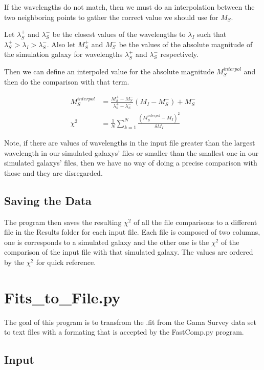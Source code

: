 \documentclass[11pt]{report}
\begin{document}
If the wavelengths do not match, then we must do an interpolation between the two neighboring points to gather the correct value we should use for $M_S$. 

Let $\lambda_S^+$ and $\lambda_S^-$ be the closest values of the wavelengths to $\lambda_I$ such that $\lambda_S^+ > \lambda_I > \lambda_S^-$.  Also let $M_S^+$ and $M_S^-$ be the values of the absolute magnitude of the simulation galaxy for wavelengths $\lambda_S^+$ and $\lambda_S^-$ respectively.

Then we can define an interpoled value for the absolute magnitude $M_S^{interpol}$ and then do the comparison with that term.

\begin{align}
M_S^{interpol} &= \frac{M_S^+ - M_S^-}{\lambda_S^+ - \lambda_S^-} (M_I - M_S^-) + M_S^-\\
\chi^2 &= \frac{1}{N} \sum_{k=1}^N \frac{ (M_S^{interpol} - M_I)^2}{\delta M_I}
\end{align}

Note, if there are values of wavelengths in the input file greater than the largest wavelength in our simulated galaxys' files or smaller than the smallest one in our simulated galaxys' files, then we have no way of doing a precise comparison with those and they are disregarded.

\subsection{Saving the Data}

The program then saves the resulting $\chi^2$ of all the file comparisons to a different file in the Results folder for each input file. Each file is composed of two columns, one is corresponds to a simulated galaxy and the other one is the $\chi^2$ of the comparison of the input file with that simulated galaxy. The values are ordered by the $\chi^2$ for quick reference.

\section{Fits\_to\_File.py}

The goal of this program is to transfrom the .fit from the Gama Survey data set to text files with a formating that is accepted by the FastComp.py program.

\subsection{Input}
\end{document}
